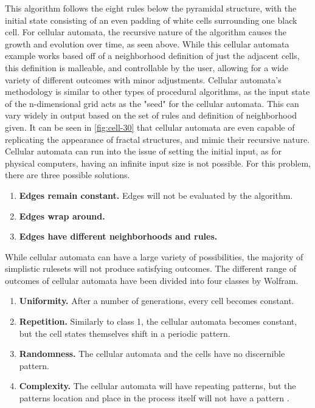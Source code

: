 \documentclass[10pt]{report}
\begin{document}
			This algorithm follows the eight rules below the pyramidal structure, with the initial state consisting of an even padding of white cells surrounding one black cell. For cellular automata, the recursive nature of the algorithm causes the growth and evolution over time, as seen above. While this cellular automata example works based off of a neighborhood definition of just the adjacent cells, this definition is malleable, and controllable by the user, allowing for a wide variety of different outcomes with minor adjustments. Cellular automata's methodology is similar to other types of procedural algorithms, as the input state of the n-dimensional grid acts as the "seed" for the cellular automata. This can vary widely in output based on the set of rules and definition of neighborhood given. It can be seen in \autoref{fig:cell-30} that cellular automata are even capable of replicating the appearance of fractal structures, and mimic their recursive nature. Cellular automata can run into the issue of setting the initial input, as for physical computers, having an infinite input size is not possible. For this problem, there are three possible solutions. 
			
			\begin{enumerate}
				\item \textbf{Edges remain constant.} Edges will not be evaluated by the algorithm.
				\item \textbf{Edges wrap around.}
				\item \textbf{Edges have different neighborhoods and rules.} \cite{nature-of-code}
			\end{enumerate}
			
			While cellular automata can have a large variety of possibilities, the majority of simplistic rulesets will not produce satisfying outcomes. The different range of outcomes of cellular automata have been divided into four classes by Wolfram.
			
			\begin{enumerate}
				\item \textbf{Uniformity.} After a number of generations, every cell becomes constant.
				\item \textbf{Repetition.} Similarly to class 1, the cellular automata becomes constant, but the cell states themselves shift in a periodic pattern.
				\item \textbf{Randomness.} The cellular automata and the cells have no discernible pattern. 
				\item \textbf{Complexity.} The cellular automata will have repeating patterns, but the patterns location and place in the process itself will not have a pattern \cite{nature-of-code}. 
			\end{enumerate}
\end{document}
